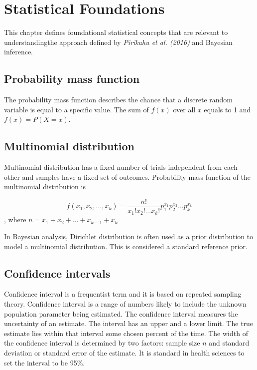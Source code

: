 \chapter{Statistical Foundations} \label{sec:Consepts}

This chapter defines foundational statistical concepts that are relevant to understandingthe approach defined by \textit{Pirikahu et al. (2016)} and Bayesian inference.

\section{Probability mass function} \label{PropabilityMassFunction}

The probability mass function describes the chance that a discrete random variable is equal to a specific value. The sum of $f(x)$ over all $x$ equals to 1 and $f(x) = P(X = x)$.\cite{pmf}

\section{Multinomial distribution}\label{MultinomialDistribution}

Multinomial distribution has a fixed number of trials independent from each other and samples have a fixed set of outcomes. Probability mass function of the multinomial distribution is

\begin{equation}
f(x_1, x_2, ..., x_k) = \frac{n!}{x_1!x_2!...x_k!}p_1^{x_1}p_2^{x_2}...p_k^{x_k}
\end{equation}, where $n = x_1 + x_2 + ... + x_{k-1} + x_k$\cite{multinomialDistribution}\cite{SINHARAY201098}

In Bayesian analysis, Dirichlet distribution is often used as a prior distribution to model a multinomial distribution. \cite{SINHARAY201098} This is considered a standard reference prior.\cite{Pirikahu2016BayesianMO}

\section{Confidence intervals}\label{ConfidenceIntervals}

Confidence interval is a frequentist term and it is based on repeated sampling theory.\cite{Schoot2014BayesianA} Confidence interval is a range of numbers likely to include the unknown population parameter being estimated.\cite{Illowsky2013IntroductorySO} The confidence interval measures the uncertainty of an estimate. The interval has an upper and a lower limit. The true estimate lies within that interval some chosen percent of the time. The width of the confidence interval is determined by two factors: sample size $n$ and standard deviation or standard error of the estimate. It is standard in health sciences to set the interval to be 95\%.\cite{Hespanhol2019UnderstandingAI}

